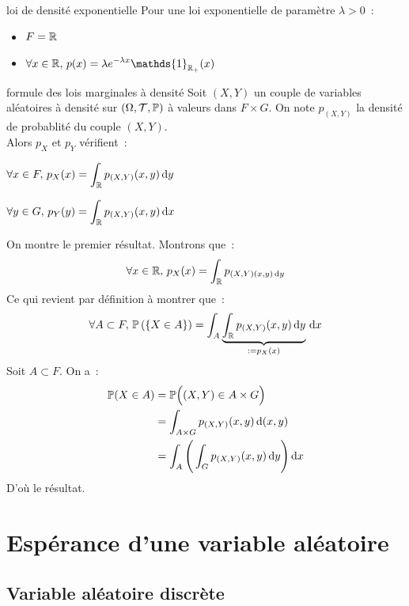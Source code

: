 \begin{exemple}{}{loi de densité exponentielle}
    Pour une loi exponentielle de paramètre $\lambda > 0$~:
    \begin{itemize}
        \item $\displaystyle F = \mathbb{R}$
        \item $\displaystyle \forall x \in \R,\, p(x) = \lambda e^{-\lambda x} \mathds{1}_{\R_+}(x)$
    \end{itemize}
\end{exemple}

\begin{proposition}{}{formule des lois marginales à densité}
    Soit $(X,Y)$ un couple de variables aléatoires à densité sur $(\Omega, \mathcal{T}, \mathbb{P})$ à valeurs dans $F\times G$. On note $p_{(X,Y)}$ la densité de probablité du couple $(X,Y)$. \\ Alors $p_X$ et $p_Y$ vérifient~:
    \begin{enumeratebf}
        \item $\displaystyle \forall x \in F,\,  p_X(x) = \int_{\mathbb{R}} p_{(X,Y)}(x,y)\,\mathrm{d}y$
        \item $\displaystyle \forall y \in G,\,  p_Y(y) = \int_{\mathbb{R}} p_{(X,Y)}(x,y)\,\mathrm{d}x$
    \end{enumeratebf}
\end{proposition}

\begin{demonstration}
    On montre le premier résultat. Montrons que~:
    $$\forall x \in \mathbb{R},\,  p_X(x) = \int_{\mathbb{R}} p_{(X,Y)(x,y)\,\mathrm{d}y}$$
    Ce qui revient par définition à montrer que~:
    $$\forall A \subset F,\, \mathbb{P}\left(\left\{X \in A\right\}\right) = \int_A \underbrace{\int_{\mathbb{R}} p_{(X,Y)}(x,y)\,\mathrm{d}y}_{:=p_X(x)} \,\mathrm{d}x$$
    Soit $A \subset F$. On a~:
    \begin{align*}
        \mathbb{P}(X \in A) &= \mathbb{P}\Big((X,Y) \in A \times G\Big)\\
        &= \int_{A \times G} p_{(X,Y)}(x,y)\,\mathrm{d}(x,y) \\
        &= \int_A \Bigg(\int_G p_{(X,Y)}(x,y)\,\mathrm{d}y\Bigg)\,\mathrm{d}x
    \end{align*}
    D'où le résultat.
\end{demonstration}


\section{Espérance d'une variable aléatoire}
\subsection{Variable aléatoire discrète}


